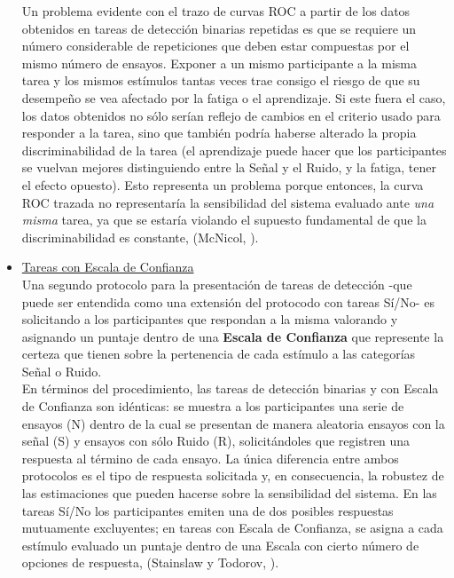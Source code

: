 \begin{itemize}
Un problema evidente con el trazo de curvas ROC a partir de los datos obtenidos en tareas de detección binarias repetidas es que se requiere un número considerable de repeticiones que deben estar compuestas por el mismo número de ensayos. Exponer a un mismo participante a la misma tarea y los mismos estímulos tantas veces trae consigo el riesgo de que su desempeño se vea afectado por la fatiga o el aprendizaje. Si este fuera el caso, los datos obtenidos no sólo serían reflejo de cambios en el criterio usado para responder a la tarea, sino que también podría haberse alterado la propia discriminabilidad de la tarea (el aprendizaje puede hacer que los participantes se vuelvan mejores distinguiendo entre la Señal y el Ruido, y la fatiga, tener el efecto opuesto). Esto representa un problema porque entonces, la curva ROC trazada no representaría la sensibilidad del sistema evaluado ante \textit{una misma} tarea, ya que se estaría violando el supuesto fundamental de que la discriminabilidad es constante, (McNicol, \citeyear{McNicol2}).\\

\item \underline{Tareas con Escala de Confianza}\\

Una segundo protocolo para la presentación de tareas de detección -que puede ser entendida como una extensión del protocodo con tareas Sí/No- es solicitando a los participantes que respondan a la misma valorando y asignando un puntaje dentro de una \textbf{Escala de Confianza} que represente la certeza que tienen sobre la pertenencia de cada estímulo a las categorías Señal o Ruido.\\

En términos del procedimiento, las tareas de detección binarias y con Escala de Confianza son idénticas: se muestra a los participantes una serie de ensayos (N) dentro de la cual se presentan de manera aleatoria ensayos con la señal (S) y ensayos con sólo Ruido (R), solicitándoles que registren una respuesta al término de cada ensayo. La única diferencia entre ambos protocolos es el tipo de respuesta solicitada y, en consecuencia, la robustez de las estimaciones que pueden hacerse sobre la sensibilidad del sistema. En las tareas Sí/No los participantes emiten una de dos posibles respuestas mutuamente excluyentes; en tareas con Escala de Confianza, se asigna a cada estímulo evaluado un puntaje dentro de una Escala con cierto número de opciones de respuesta, (Stainslaw y Todorov, \citeyear{Stainslaw1999}).\\


\end{itemize}
